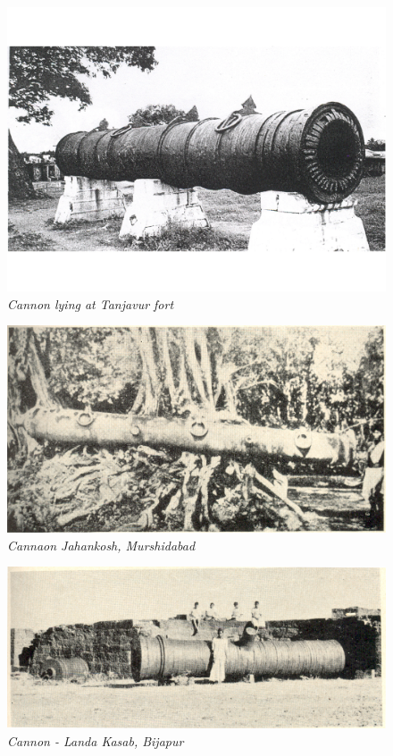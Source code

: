 \begin{figure}[H]
\setcounter{figure}{29}
\includegraphics[scale=1]{images/chapter-5/Fig30.jpg}

\vspace{-.7cm}
\caption{\textit{Cannon lying at Tanjavur fort}}\label{chapter-5-fig30}
\end{figure}

\begin{figure}[H]
\includegraphics[scale=.8]{images/chapter-5/Fig31.jpg}
\caption{\textit{Cannaon Jahankosh, Murshidabad}}\label{chapter-5-fig31}
\end{figure}

\newpage

\begin{figure}[H]
\includegraphics[scale=.7]{images/chapter-5/Fig32.jpg}
\caption{\textit{Cannon - Landa Kasab, Bijapur}}\label{chapter-5-fig32}
\end{figure}

